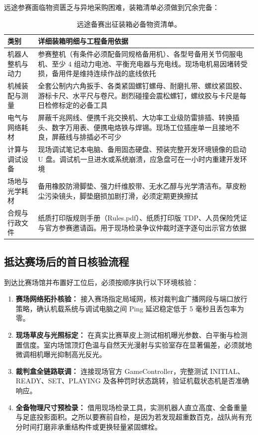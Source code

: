 远途参赛面临物资匮乏与异地采购困难，装箱清单必须做到冗余完备：

\begin{table}[H]
\centering
\small
\begin{tabularx}{\textwidth}{p{3.2cm} X}
\toprule
\textbf{类别} & \textbf{详细装箱明细与工程备用依据} \\
\midrule
机器人整机与动力 & 参赛整机（有条件必须配备同规格备用机）、各型号备用关节伺服电机、至少 4 组动力电池、平衡充电器与充电线。现场电机易因堵转受损，备用件是维持连续作战的底线依托 \\
\addlinespace
机械装配与测量 & 全套公制内六角扳手、各类紧固螺钉螺母、耐磨扎带、螺纹紧固胶、游标卡尺、水平尺与卷尺。剧烈碰撞会震松螺钉，螺纹胶与卡尺是每日检修标定的必备工具 \\
\addlinespace
电气与网络耗材 & 屏蔽千兆网线、便携千兆交换机、大功率工业级防雷排插、转换插头、数字万用表、便携电烙铁与焊锡。现场工位插座单一且接地不良，屏蔽线与排插必不可少 \\
\addlinespace
计算与调试设备 & 现场调试笔记本电脑、备用固态硬盘、预装完整开发环境镜像的启动 U 盘。调试机一旦进水或系统崩溃，应急盘可在一小时内重建开发环境 \\
\addlinespace
场地与光学耗材 & 备用橡胶防滑脚垫、强力纤维胶带、无水乙醇与光学清洁布。草皮粉尘污染镜头，脚垫磨损加剧打滑，必须定期更换擦拭 \\
\addlinespace
合规与行政文件 & 纸质打印版规则手册（Rules.pdf）、纸质打印版 TDP、人员保险凭证与官方参赛邀请函。用于现场检录争议仲裁时逐字逐句出示官方依据 \\
\bottomrule
\end{tabularx}
\caption{远途备赛出征装箱必备物资清单。}
\end{table}

\subsection{抵达赛场后的首日核验流程}

到达比赛场馆并布置好工位后，必须按顺序执行以下环境核验：

\begin{enumerate}[leftmargin=*]
    \item \textbf{赛场网络拓扑核验：} 接入赛场指定局域网，核对裁判盒广播网段与端口放行策略，确认机载系统与调试电脑之间 Ping 延迟稳定低于 5 毫秒且丢包率为零。
    \item \textbf{现场草皮与光照标定：} 在真实比赛草皮上测试相机曝光参数、白平衡与检测置信度。室内场馆顶灯色温与自然天光漫射与实验室存在显著偏差，必须就地微调相机曝光抑制高光反光。
    \item \textbf{裁判盒全链路联调：} 连接现场官方 GameController，完整测试 INITIAL、READY、SET、PLAYING 及各种罚时状态跳转，验证机载状态机是否准确响应。
    \item \textbf{全备物理尺寸预检录：} 借用现场检录工具，实测机器人直立高度、全备重量与足底投影面积。之所以要赛前自检，是因为若发现超重数百克，战队尚有充分时间打磨非承重结构件或更换轻量紧固螺栓。
\end{enumerate}

